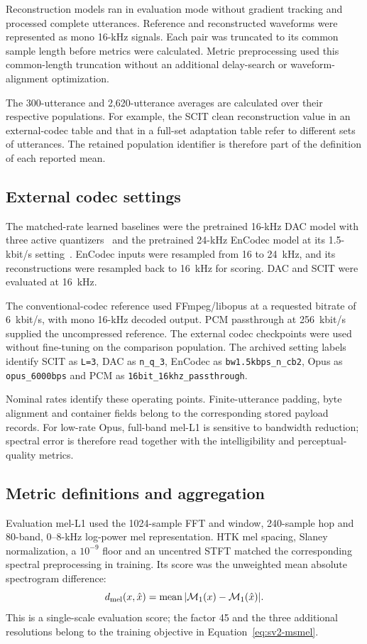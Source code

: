 Reconstruction models ran in evaluation mode without gradient tracking and processed complete utterances. Reference and reconstructed waveforms were represented as mono 16-kHz signals. Each pair was truncated to its common sample length before metrics were calculated. Metric preprocessing used this common-length truncation without an additional delay-search or waveform-alignment optimization.

The 300-utterance and 2,620-utterance averages are calculated over their respective populations. For example, the SCIT clean reconstruction value in an external-codec table and that in a full-set adaptation table refer to different sets of utterances. The retained population identifier is therefore part of the definition of each reported mean.

\subsection{External codec settings}
The matched-rate learned baselines were the pretrained 16-kHz DAC model with three active quantizers~\cite{dac} and the pretrained 24-kHz EnCodec model at its 1.5-kbit/s setting~\cite{encodec}. EnCodec inputs were resampled from 16 to 24~kHz, and its reconstructions were resampled back to 16~kHz for scoring. DAC and SCIT were evaluated at 16~kHz.

The conventional-codec reference used FFmpeg/libopus at a requested bitrate of 6~kbit/s, with mono 16-kHz decoded output. PCM passthrough at 256~kbit/s supplied the uncompressed reference. The external codec checkpoints were used without fine-tuning on the comparison population. The archived setting labels identify SCIT as \texttt{L=3}, DAC as \texttt{n\_q\_3}, EnCodec as \texttt{bw1.5kbps\_n\_cb2}, Opus as \texttt{opus\_6000bps} and PCM as \texttt{16bit\_16khz\_passthrough}.

Nominal rates identify these operating points. Finite-utterance padding, byte alignment and container fields belong to the corresponding stored payload records. For low-rate Opus, full-band mel-L1 is sensitive to bandwidth reduction; spectral error is therefore read together with the intelligibility and perceptual-quality metrics.

\subsection{Metric definitions and aggregation}
Evaluation mel-L1 used the 1024-sample FFT and window, 240-sample hop and 80-band, 0--8-kHz log-power mel representation. HTK mel spacing, Slaney normalization, a $10^{-9}$ floor and an uncentred STFT matched the corresponding spectral preprocessing in training. Its score was the unweighted mean absolute spectrogram difference:
\begin{equation}
 d_{\rm mel}(x,\hat x)
 =\operatorname{mean}|\mathcal M_1(x)-\mathcal M_1(\hat x)|.
 \label{eq:sv2-evalmel}
\end{equation}
This is a single-scale evaluation score; the factor 45 and the three additional resolutions belong to the training objective in Equation~\ref{eq:sv2-msmel}.

